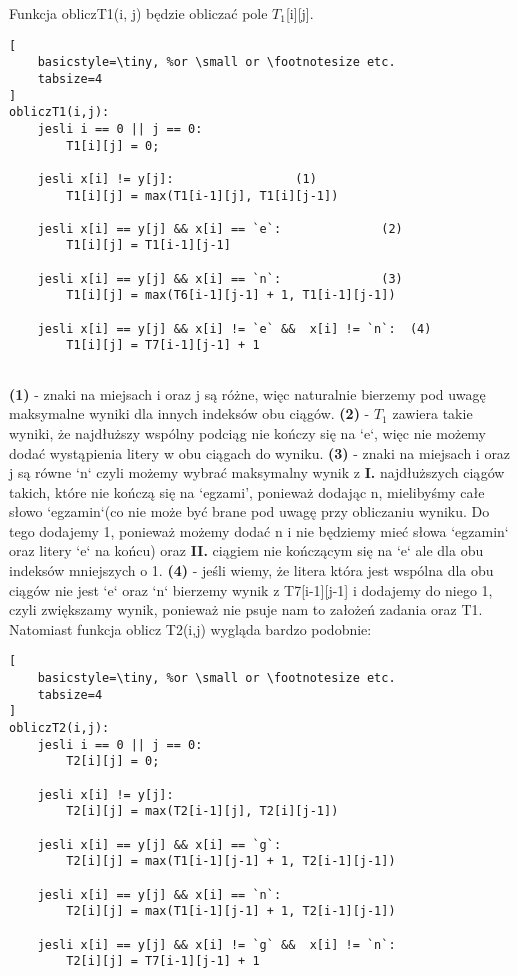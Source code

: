 \documentclass[a4paper,10pt]{article}
\begin{document}
Funkcja obliczT1(i, j) będzie obliczać pole ${T_1}$[i][j].
\begin{lstlisting}[
    basicstyle=\tiny, %or \small or \footnotesize etc.
    tabsize=4
]
obliczT1(i,j):
	jesli i == 0 || j == 0:
		T1[i][j] = 0;

	jesli x[i] != y[j]:					(1)
		T1[i][j] = max(T1[i-1][j], T1[i][j-1])

	jesli x[i] == y[j] && x[i] == `e`:  			(2)
		T1[i][j] = T1[i-1][j-1]

	jesli x[i] == y[j] && x[i] == `n`:  			(3)
		T1[i][j] = max(T6[i-1][j-1] + 1, T1[i-1][j-1])

	jesli x[i] == y[j] && x[i] != `e` &&  x[i] != `n`: 	(4)
		T1[i][j] = T7[i-1][j-1] + 1


\end{lstlisting}
\textbf{(1)} - znaki na miejsach i oraz j są różne, więc naturalnie bierzemy pod uwagę maksymalne wyniki dla innych indeksów obu ciągów. \newline
\textbf{(2)} - $T_1$ zawiera takie wyniki, że najdłuższy wspólny podciąg nie kończy się na `e`, więc nie możemy dodać wystąpienia litery w obu ciągach do wyniku. \newline \newline
\textbf{(3)} - znaki na miejsach i oraz j są równe `n` czyli możemy wybrać maksymalny wynik z \textbf{I.} najdłuższych ciągów takich, które nie kończą się na `egzami', ponieważ dodając n, mielibyśmy całe słowo `egzamin`(co nie może być brane pod uwagę przy obliczaniu wyniku. Do tego dodajemy 1, ponieważ możemy dodać n i nie będziemy mieć słowa `egzamin` oraz litery `e` na końcu) oraz \textbf{II.} ciągiem nie kończącym się na `e` ale dla obu indeksów mniejszych o 1. \newline  \newline
\textbf{(4)} - jeśli wiemy, że litera która jest wspólna dla obu ciągów nie jest `e` oraz `n` bierzemy wynik z  T7[i-1][j-1] i dodajemy do niego 1, czyli zwiększamy wynik, ponieważ nie psuje nam to założeń zadania oraz T1. \newpage
Natomiast funkcja oblicz T2(i,j) wygląda bardzo podobnie:
\begin{lstlisting}[
    basicstyle=\tiny, %or \small or \footnotesize etc.
    tabsize=4
]
obliczT2(i,j):
	jesli i == 0 || j == 0:
		T2[i][j] = 0;

	jesli x[i] != y[j]:
		T2[i][j] = max(T2[i-1][j], T2[i][j-1])

	jesli x[i] == y[j] && x[i] == `g`:
		T2[i][j] = max(T1[i-1][j-1] + 1, T2[i-1][j-1])

	jesli x[i] == y[j] && x[i] == `n`:
		T2[i][j] = max(T1[i-1][j-1] + 1, T2[i-1][j-1])

	jesli x[i] == y[j] && x[i] != `g` &&  x[i] != `n`:
		T2[i][j] = T7[i-1][j-1] + 1

\end{lstlisting}
\end{document}
